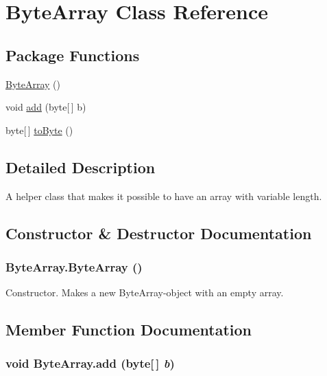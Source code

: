 \hypertarget{class_byte_array}{
\section{Byte\-Array Class Reference}
\label{class_byte_array}
}
\subsection*{Package Functions}
\begin{CompactItemize}
\item 
\hyperlink{class_byte_array_c0}{Byte\-Array} ()
\item 
void \hyperlink{class_byte_array_c1}{add} (byte\mbox{[}$\,$\mbox{]} b)
\item 
byte\mbox{[}$\,$\mbox{]} \hyperlink{class_byte_array_c2}{to\-Byte} ()
\end{CompactItemize}


\subsection{Detailed Description}
A helper class that makes it possible to have an array with variable length. 



\subsection{Constructor \& Destructor Documentation}
\hypertarget{class_byte_array_c0}{
\subsubsection[ByteArray]{\setlength{\rightskip}{0pt plus 5cm}Byte\-Array.Byte\-Array ()}}
\label{class_byte_array_c0}


Constructor. Makes a new Byte\-Array-object with an empty array. 

\subsection{Member Function Documentation}
\hypertarget{class_byte_array_c1}{
\subsubsection[add]{\setlength{\rightskip}{0pt plus 5cm}void Byte\-Array.add (byte\mbox{[}$\,$\mbox{]} {\em b})}}
\label{class_byte_array_c1}


